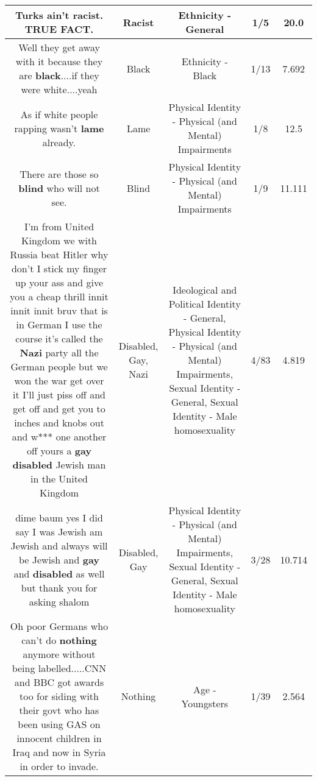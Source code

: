 \documentclass[11pt]{article}
\newlength\mylength
\begin{document}
\begin{center}
\begin{longtable}{|C{.65\mylength}|C{.30\mylength}|C{.12\mylength}|C{.12\mylength}|C{.12\mylength}|}
  \small Turks ain't \textbf{racist}. TRUE FACT.\normalsize   & Racist & Ethnicity - General & 1/5 & 20.0 \\  \hline
  \small Well they get away with it because they are \textbf{black}....if they were white....yeah\normalsize   & Black & Ethnicity - Black & 1/13 & 7.692 \\  \hline
  \small As if white people rapping wasn't \textbf{lame} already.\normalsize   & Lame & Physical Identity - Physical (and Mental) Impairments & 1/8 & 12.5 \\  \hline
  \small There are those so \textbf{blind} who will not see.\normalsize   & Blind & Physical Identity - Physical (and Mental) Impairments & 1/9 & 11.111 \\  \hline
  \small I'm from United Kingdom we with Russia beat Hitler why don't I stick my finger up your ass and give you a cheap thrill innit innit innit bruv that is in German I use the course it's called the \textbf{Nazi} party all the German people but we won the war get over it I'll just piss off and get off and get you to inches and knobs out and w*** one another off yours a \textbf{g\textbf{ay}} \textbf{disabled} Jewish man in the United Kingdom\normalsize   & Disabled, Gay, Nazi &  Ideological and Political Identity - General, Physical Identity - Physical (and Mental) Impairments, Sexual Identity - General, Sexual Identity - Male homosexuality & 4/83 & 4.819 \\  \hline
  \small dime baum yes I did say I was Jewish am Jewish and always will be Jewish and \textbf{g\textbf{ay}} and \textbf{disabled} as well but thank you for asking shalom\normalsize   & Disabled, Gay & Physical Identity - Physical (and Mental) Impairments, Sexual Identity - General, Sexual Identity - Male homosexuality & 3/28 & 10.714 \\  \hline
  \small Oh poor Germans who can't do \textbf{nothing} anymore without being labelled.....CNN and BBC got awards too for siding with their govt who has been using GAS on innocent children in Iraq and now in Syria in order to invade.\normalsize   & Nothing & Age - Youngsters & 1/39 & 2.564 \\  \hline

\end{longtable}
\end{center}
\end{document}
